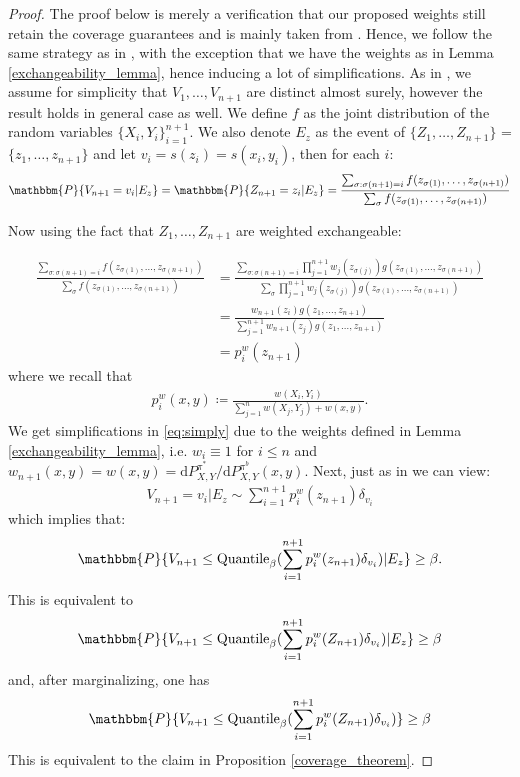 \begin{proof}
The proof below is merely a verification that our proposed weights still retain the coverage guarantees and is mainly taken from \cite{tibshirani2020conformal}. Hence, we follow the same strategy as in \cite{tibshirani2020conformal}, with the exception that we have the weights as in Lemma \ref{exchangeability_lemma}, hence inducing a lot of simplifications. As in \cite{tibshirani2020conformal}, we assume for simplicity that $V_1, \dots, V_{n+1}$ are distinct almost surely, however the result holds in general case as well. We define $f$ as the joint distribution of the random variables $\{X_i, Y_i\}_{i=1}^{n+1}$. We also denote $E_z$ as the event of $\{Z_1, \dots, Z_{n+1}\}$ = $\{z_1, \dots, z_{n+1}\}$ and let $v_i = s(z_i) = s(x_i, y_i)$, then for each $i$:
\begin{align}
    \mathbbm{P}\{V_{n+1} = v_i| E_z\} = \mathbbm{P}\{Z_{n+1}=z_i|E_z\} = \frac{\sum_{\sigma:\sigma(n+1)=i}f(z_{\sigma(1)}, \dots, z_{\sigma(n+1)})}{\sum_{\sigma}f(z_{\sigma(1)}, \dots, z_{\sigma(n+1)})}
\end{align}

Now using the fact that $Z_1, \dots, Z_{n+1}$ are weighted exchangeable:

\begin{align}
    \frac{\sum_{\sigma:\sigma(n+1)=i}f(z_{\sigma(1)}, \dots, z_{\sigma(n+1)})}{\sum_{\sigma}f(z_{\sigma(1)}, \dots, z_{\sigma(n+1)})}&= \frac{\sum_{\sigma:\sigma(n+1)=i}\prod_{j=1}^{n+1}w_{j}(z_{\sigma(j)})g(z_{\sigma(1)}, \dots, z_{\sigma(n+1)})}{\sum_{\sigma}\prod_{j=1}^{n+1} w_{j}(z_{\sigma(j)})g(z_{\sigma(1)}, \dots, z_{\sigma(n+1)})}\label{eq:simply}\\ 
    &= \frac{w_{n+1}(z_i)g(z_{1}, \dots, z_{n+1})}{\sum_{j=1}^{n+1} w_{n+1}(z_{j})g(z_{1}, \dots, z_{n+1})}\nonumber\\
    &= p_i^w(z_{n+1}) \nonumber
\end{align}
where we recall that
\begin{align}
    p_i^{w}(x, y) \coloneqq \frac{w(X_i, Y_i)}{\sum_{j=1}^n w(X_j, Y_j) + w(x, y)}. \nonumber
\end{align}
We get simplifications in \eqref{eq:simply} due to the weights defined in Lemma \ref{exchangeability_lemma}, i.e. $w_i \equiv 1$ for $i \leq n$ and $w_{n+1}(x, y) = w(x, y) = \mathrm{d}P^{\pi^{*}}_{X,Y}/\mathrm{d}P^{\pi^{b}}_{X,Y}(x,y)$.
Next, just as in \cite{tibshirani2020conformal} we can view:
\begin{align}
    V_{n+1} = v_i| E_z \sim \sum_{i=1}^{n+1}p_i^w(z_{n+1}) \delta_{v_i}
\end{align}
which implies that:
$$
\mathbbm{P}\{V_{n+1} \leq \text{Quantile}_{\beta}(\sum_{i=1}^{n+1}p_i^w(z_{n+1}) \delta_{v_i}) | E_z\} \geq \beta.
$$
This is equivalent to 
$$
\mathbbm{P}\{V_{n+1} \leq \text{Quantile}_{\beta}(\sum_{i=1}^{n+1}p_i^w(Z_{n+1}) \delta_{v_i}) | E_z\} \geq \beta
$$
and, after marginalizing, one has
$$
\mathbbm{P}\{V_{n+1} \leq \text{Quantile}_{\beta}(\sum_{i=1}^{n+1}p_i^w(Z_{n+1}) \delta_{v_i})\} \geq \beta
$$
This is equivalent to the claim in Proposition \ref{coverage_theorem}.
\end{proof}

